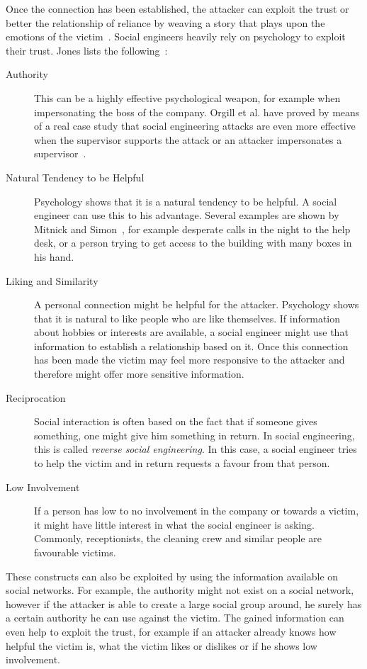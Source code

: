 Once the connection has been established, the attacker can exploit the trust or
better the relationship of reliance by \glqq{}weaving a story that plays upon
the emotions of the victim\grqq{}~\cite{thornburgh2004}. Social engineers
heavily rely on psychology to exploit their trust. Jones lists the
following~\cite{jones2004}:

\begin{description}

\item[Authority] This can be a highly effective psychological weapon, for
  example when impersonating the boss of the company. Orgill et al. have
  proved by means of a real case study that social engineering attacks are even more
  effective when the supervisor supports the attack or an attacker
  impersonates a supervisor~\cite{orgill2004}.
\item[Natural Tendency to be Helpful] Psychology shows that it is a natural
  tendency to be helpful. A social engineer can use this to his advantage.
  Several examples are shown by Mitnick and Simon~\cite{mitnick2003}, for example
  desperate calls in the night to the help desk, or a person trying to get access
  to the building with many boxes in his hand.
\item[Liking and Similarity] A personal connection might be helpful for the
  attacker. Psychology shows that it is natural to like people who are like
  themselves. If information about hobbies or interests are available, a social
  engineer might use that information to establish a relationship based on 
  it. Once this connection has been made the victim may feel more
  responsive to the attacker and therefore might offer more sensitive
  information.
\item[Reciprocation] Social interaction is often based on the fact that if
  someone gives something, one might give him something in return. In social
  engineering, this is called \textit{reverse social engineering}. In this case, a
  social engineer tries to help the victim and in return requests a favour from
  that person.
\item[Low Involvement] If a person has low to no involvement in the company or
  towards a victim, it might have little interest in what the social engineer is
  asking. Commonly, receptionists, the cleaning crew and similar people are
  favourable victims.
\end{description}

These constructs can also be exploited by using the information available on social
networks. For example, the authority might not exist on a social network,
however if the attacker is able to create a large social group around, he surely
has a certain authority he can use against the victim. The gained information
can even help to exploit the trust, for example if an attacker already knows
how helpful the victim is, what the victim likes or dislikes or if he shows low
involvement.

